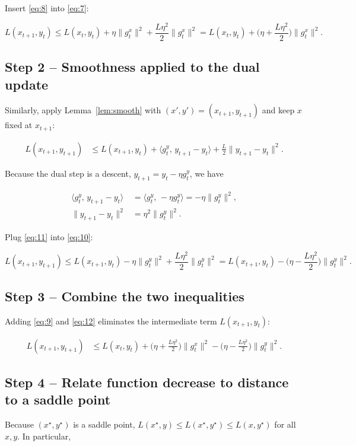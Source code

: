 \documentclass{article}
\begin{document}
Insert \eqref{eq:8} into \eqref{eq:7}:

\[
L(x_{t+1},y_t) \le L(x_t,y_t)+\eta\|g_t^{x}\|^{2}
+\frac{L\eta^{2}}{2}\|g_t^{x}\|^{2}
= L(x_t,y_t)+\Big(\eta+\frac{L\eta^{2}}{2}\Big)\|g_t^{x}\|^{2}.
\tag{9}
\]

\subsection*{Step 2 – Smoothness applied to the dual update}
Similarly, apply Lemma~\ref{lem:smooth} with \((x',y')=(x_{t+1},y_{t+1})\) and keep \(x\) fixed at \(x_{t+1}\):

\[
\begin{aligned}
L(x_{t+1},y_{t+1})
&\le L(x_{t+1},y_t)
+ \langle g_t^{y},\,y_{t+1}-y_t\rangle
+\frac{L}{2}\|y_{t+1}-y_t\|^{2}.
\end{aligned}
\tag{10}
\]

Because the dual step is a descent, \(y_{t+1}=y_t-\eta g_t^{y}\), we have  

\[
\begin{aligned}
\langle g_t^{y},\,y_{t+1}-y_t\rangle
&= \langle g_t^{y},\,-\eta g_t^{y}\rangle
= -\eta\|g_t^{y}\|^{2},\\[1mm]
\|y_{t+1}-y_t\|^{2}
&= \eta^{2}\|g_t^{y}\|^{2}.
\end{aligned}
\tag{11}
\]

Plug \eqref{eq:11} into \eqref{eq:10}:

\[
L(x_{t+1},y_{t+1})
\le L(x_{t+1},y_t)
-\eta\|g_t^{y}\|^{2}
+\frac{L\eta^{2}}{2}\|g_t^{y}\|^{2}
= L(x_{t+1},y_t)-\Big(\eta-\frac{L\eta^{2}}{2}\Big)\|g_t^{y}\|^{2}.
\tag{12}
\]

\subsection*{Step 3 – Combine the two inequalities}
Adding \eqref{eq:9} and \eqref{eq:12} eliminates the intermediate term \(L(x_{t+1},y_t)\):

\[
\begin{aligned}
L(x_{t+1},y_{t+1})
&\le L(x_t,y_t)
+\Big(\eta+\frac{L\eta^{2}}{2}\Big)\|g_t^{x}\|^{2}
-\Big(\eta-\frac{L\eta^{2}}{2}\Big)\|g_t^{y}\|^{2}.
\end{aligned}
\tag{13}
\]

\subsection*{Step 4 – Relate function decrease to distance to a saddle point}
Because \((x^{\star},y^{\star})\) is a saddle point,
\(L(x^{\star},y)\le L(x^{\star},y^{\star})\le L(x,y^{\star})\) for all \(x,y\). In particular,
\end{document}
